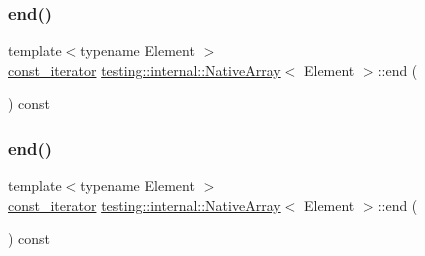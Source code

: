 \subsubsection{\texorpdfstring{end()}{end()}\hspace{0.1cm}{\footnotesize\ttfamily [2/3]}}
{\footnotesize\ttfamily template$<$typename Element $>$ \\
\mbox{\hyperlink{classtesting_1_1internal_1_1_native_array_a9ce7c8408460d7158a2870456d134557}{const\+\_\+iterator}} \mbox{\hyperlink{classtesting_1_1internal_1_1_native_array}{testing\+::internal\+::\+Native\+Array}}$<$ Element $>$\+::end (\begin{DoxyParamCaption}{ }\end{DoxyParamCaption}) const\hspace{0.3cm}{\ttfamily [inline]}}

\mbox{\label{classtesting_1_1internal_1_1_native_array_ae1cda748e49c6906421c6183c4d07c5a}} 
\subsubsection{\texorpdfstring{end()}{end()}\hspace{0.1cm}{\footnotesize\ttfamily [3/3]}}
{\footnotesize\ttfamily template$<$typename Element $>$ \\
\mbox{\hyperlink{classtesting_1_1internal_1_1_native_array_a9ce7c8408460d7158a2870456d134557}{const\+\_\+iterator}} \mbox{\hyperlink{classtesting_1_1internal_1_1_native_array}{testing\+::internal\+::\+Native\+Array}}$<$ Element $>$\+::end (\begin{DoxyParamCaption}{ }\end{DoxyParamCaption}) const\hspace{0.3cm}{\ttfamily [inline]}}

\mbox{\label{classtesting_1_1internal_1_1_native_array_a6633f3eab6947d4502fb1c69f95be66e}} 
